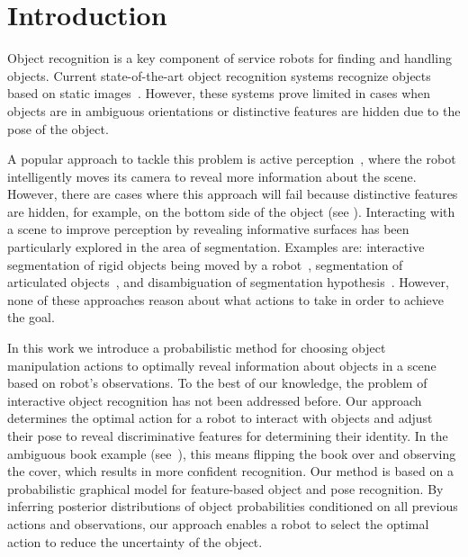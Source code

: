 
\section{Introduction}
    \vspace{-0.5ex}


Object recognition is a key component of service robots for finding and handling objects.
Current state-of-the-art object recognition systems recognize objects based on static images~\cite{tang2012textured,van2013fusing}.
However, these systems prove limited in cases when objects are in ambiguous orientations or distinctive features are hidden due to the pose of the object.

A popular approach to tackle this problem is active perception~\cite{atanasov2013hypothesis,hollinger2011active}, where the robot intelligently moves its camera to reveal more information about the scene.
However, there are cases where this approach will fail because distinctive features are hidden, for example, on the bottom side of the object (see ).
Interacting with a scene to improve perception by revealing informative surfaces has been particularly explored in the area of segmentation.
Examples are: interactive segmentation of rigid objects being moved by a robot~\cite{KenneyInteractive}, segmentation of articulated objects~\cite{Katz-WS-MM-ICRA2011}, and disambiguation of segmentation hypothesis~\cite{bergstrom11icvs}.
However, none of these approaches reason about what actions to take in order to achieve the goal.

In this work we introduce a probabilistic method for choosing object manipulation actions to optimally reveal information about objects in a scene based on robot's observations.
To the best of our knowledge, the problem of interactive object recognition has not been addressed before. 
Our approach determines the optimal action for a robot to interact with objects and adjust their pose to reveal discriminative features for determining their identity.
In the ambiguous book example (see~), this means flipping the book over and observing the cover, which results in more confident recognition.
Our method is based on a probabilistic graphical model for feature-based object and pose recognition.
By inferring posterior distributions of object probabilities conditioned on all previous actions and observations, our approach enables a robot to select the optimal action to reduce the uncertainty of the object.

